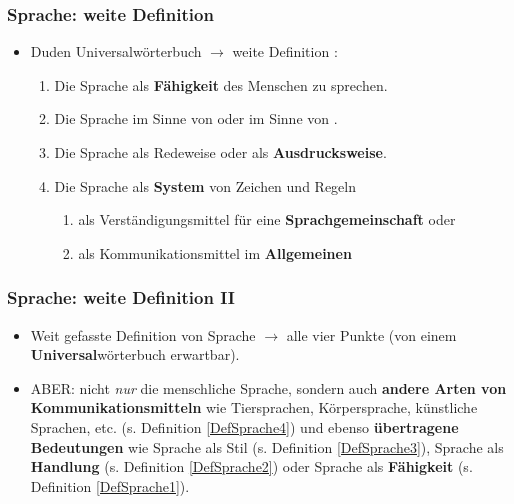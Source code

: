 \begin{frame}
\frametitle{Sprache: weite Definition}

\begin{itemize}
	\item<1-> Duden Universalwörterbuch $\rightarrow$ weite Definition \citep[vgl.][]{Duden13a}:
	
	\begin{enumerate}
		\item<2->\label{DefSprache1} Die Sprache als \textbf{Fähigkeit} des Menschen zu sprechen.
		\item<3->\label{DefSprache2} Die Sprache im Sinne von  oder im Sinne von .
		\item<4->\label{DefSprache3} Die Sprache als Redeweise oder als \textbf{Ausdrucksweise}.
		\item<5->\label{DefSprache4} Die Sprache als \textbf{System} von Zeichen und Regeln

		\begin{enumerate}
			\item<5->\label{DefSprache4a} als Verständigungsmittel für eine \textbf{Sprachgemeinschaft} oder
			\item<5->\label{DefSprache4b} als Kommunikationsmittel im \textbf{Allgemeinen}
		\end{enumerate}
			
	\end{enumerate}
	
\end{itemize}

\end{frame}



\begin{frame}
\frametitle{Sprache: weite Definition II}
		
\begin{itemize}
	\item<1-> Weit gefasste Definition von Sprache $\rightarrow$ alle vier Punkte (von einem \textbf{Universal}wörterbuch erwartbar).
	\item<2-> ABER: nicht \textit{nur} die menschliche Sprache, sondern auch \textbf{andere Arten von Kommunikationsmitteln} wie Tiersprachen, Körpersprache, künstliche Sprachen, etc. (s. Definition \ref{DefSprache4}) und ebenso \textbf{übertragene Bedeutungen} wie Sprache als Stil (s. Definition 	\ref{DefSprache3}), Sprache als \textbf{Handlung} (s. Definition \ref{DefSprache2}) oder Sprache als \textbf{Fähigkeit} (s. Definition \ref{DefSprache1}).

\end{itemize}
		
\end{frame}


